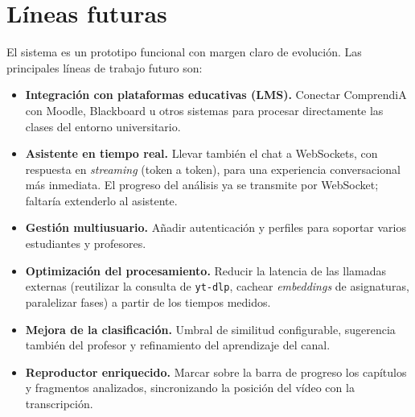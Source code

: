\section{Líneas futuras}

El sistema es un prototipo funcional con margen claro de evolución. Las principales líneas de
trabajo futuro son:

\begin{itemize}
  \item \textbf{Integración con plataformas educativas (LMS).} Conectar ComprendiA con Moodle,
        Blackboard u otros sistemas para procesar directamente las clases del entorno
        universitario.
  \item \textbf{Asistente en tiempo real.} Llevar también el chat a WebSockets, con respuesta en
        \textit{streaming} (token a token), para una experiencia conversacional más inmediata. El
        progreso del análisis ya se transmite por WebSocket; faltaría extenderlo al asistente.
  \item \textbf{Gestión multiusuario.} Añadir autenticación y perfiles para soportar varios
        estudiantes y profesores.
  \item \textbf{Optimización del procesamiento.} Reducir la latencia de las llamadas externas
        (reutilizar la consulta de \texttt{yt-dlp}, cachear \textit{embeddings} de asignaturas,
        paralelizar fases) a partir de los tiempos medidos.
  \item \textbf{Mejora de la clasificación.} Umbral de similitud configurable, sugerencia también
        del profesor y refinamiento del aprendizaje del canal.
  \item \textbf{Reproductor enriquecido.} Marcar sobre la barra de progreso los capítulos y
        fragmentos analizados, sincronizando la posición del vídeo con la transcripción.
\end{itemize}


